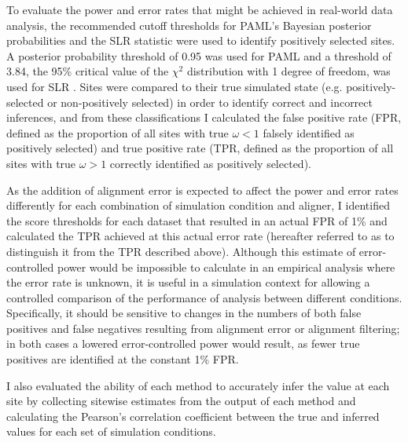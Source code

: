 To evaluate the power and error rates that might be achieved in
real-world data analysis, the recommended cutoff thresholds for PAML's
Bayesian posterior probabilities and the SLR statistic were used to
identify positively selected sites. A posterior probability threshold
of 0.95 was used for PAML \citep{Yang2005Bayes} and a threshold of 3.84,
the 95\% critical value of the $\chi^2$ distribution with 1 degree
of freedom, was used for SLR \citep{Massingham2005}. Sites were
compared to their true simulated state (e.g. positively-selected or
non-positively selected) in order to identify correct and incorrect
inferences, and from these classifications I calculated the false
positive rate (FPR, defined as the proportion of all sites with true
$\omega<1$ falsely identified as positively selected) and true positive rate
(TPR, defined as the proportion of all sites with true $\omega>1$ correctly
identified as positively selected).

As the addition of alignment error is expected to affect the power and
error rates differently for each combination of simulation condition
and aligner, I identified the score thresholds for each dataset that
resulted in an actual FPR of 1\% and calculated the TPR achieved at
this actual error rate (hereafter referred to as \tpr{} to distinguish
it from the TPR described above). Although this estimate of
error-controlled power would be impossible to calculate in an
empirical analysis where the error rate is unknown, it is useful in a
simulation context for allowing a controlled comparison of the
performance of \sw analysis between different
conditions. Specifically, it should be sensitive to changes in the
numbers of both false positives and false negatives resulting from
alignment error or alignment filtering; in both cases a lowered
error-controlled power would result, as fewer true positives are
identified at the constant 1\% FPR.

I also evaluated the ability of each method to accurately infer the
\omg value at each site by collecting sitewise \omg estimates from
the output of each method and calculating the Pearson's correlation
coefficient between the true and inferred \omg values for each set
of simulation conditions.

